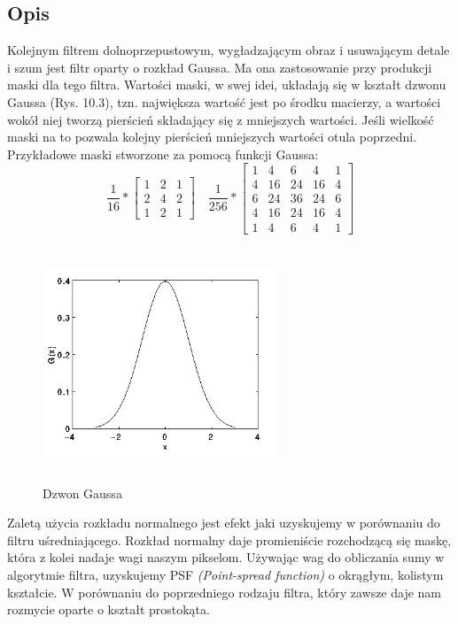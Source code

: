 \documentclass[a4paper,12pt]{book}
\begin{document}
		\subsection{Opis}
			Kolejnym filtrem dolnoprzepustowym, wygładzającym obraz i usuwającym detale i szum jest filtr oparty o rozkład Gaussa. Ma ona zastosowanie przy produkcji maski dla tego filtra. Wartości maski, w swej idei, układają się w kształt dzwonu Gaussa (Rys. 10.3), tzn. największa wartość jest po środku macierzy, a wartości wokół niej tworzą pierścień składający się z mniejszych wartości. Jeśli wielkość maski na to pozwala kolejny pierścień mniejszych wartości otula poprzedni. \newline
			Przykładowe maski stworzone za pomocą funkcji Gaussa: 
			\begin{equation*}
				\frac{1}{16}
				*
				\begin{bmatrix}
				1 & 2 & 1 \\
				2 & 4 & 2 \\
				1 & 2 & 1
				\end{bmatrix}
				\quad
				\frac{1}{256}
				*
				\begin{bmatrix}
				1 & 4 & 6 & 4 & 1 \\
				4 & 16 & 24 & 16 & 4 \\
				6 & 24 & 36 & 24 & 6 \\
				4 & 16 & 24 & 16 & 4 \\
				1 & 4 & 6 & 4 & 1
				\end{bmatrix}
			\end{equation*}
			\begin{figure}[H]
				\caption{Dzwon Gaussa}
				\includegraphics[width=7cm, height=7cm]{overview/gauss-bell.png}
			\end{figure}
			Zaletą użycia rozkładu normalnego jest efekt jaki uzyskujemy w porównaniu do filtru uśredniającego. Rozkład normalny daje promieniście rozchodzącą się maskę, która z kolei nadaje wagi naszym pikselom. Używając wag do obliczania sumy w algorytmie filtra, uzyskujemy PSF \textit{(Point-spread function)} o okrągłym, kolistym kształcie. W porównaniu do poprzedniego rodzaju filtra, który zawsze daje nam rozmycie oparte o kształt prostokąta. 
\end{document}
